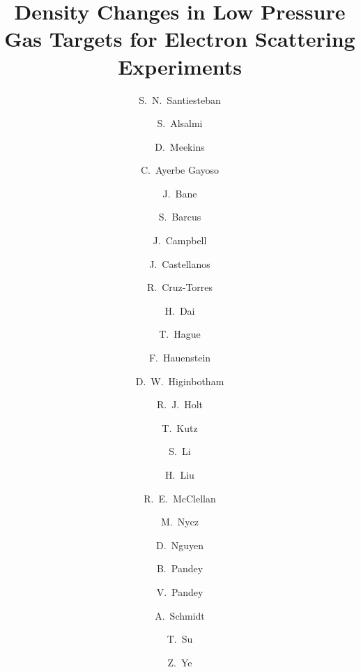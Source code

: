 \documentclass[review,numbers,sort&compress]{elsarticle}
\begin{document}
\linenumbers

\begin{frontmatter}


\title{Density Changes in Low Pressure Gas Targets for Electron Scattering Experiments}

\author[UNH]{S.~N.~Santiesteban}
\author[Kent]{S.~Alsalmi}
\author[JLab]{D.~Meekins}
\author[WM]{C.~Ayerbe Gayoso}
\author[TN]{J.~Bane}
\author[WM]{S.~Barcus}
\author[SM]{J.~Campbell}
\author[FI]{J.~Castellanos}
\author[MIT]{R.~Cruz-Torres}
\author[VT]{H.~Dai}
\author[Kent]{T.~Hague}
\author[OD]{F.~Hauenstein}
\author[JLab]{D.~W.~Higinbotham}
\author[argonne,CalTech]{R.~J.~Holt}
\author[SB]{T.~Kutz}
\author[UNH]{S.~Li}
\author[COL]{H.~Liu}
\author[JLab]{R.~E.~McClellan}
\author[Kent]{M.~Nycz}
\author[UVA]{ D.~Nguyen}
\author[hampton]{B.~Pandey}
\author[VT]{V.~Pandey}
\author[MIT]{A.~Schmidt}
\author[Kent]{T.~Su}
\author[argonne]{Z.~Ye}


\address[UNH]{University of New Hampshire, Durham, New Hampshire 03824, USA}
\address[Kent]{Kent State University, Kent, Ohio 44240, USA}
\address[JLab]{Jefferson Lab, Newport News, Virginia 23601 USA}
\address[TN]{The University of Tennessee, Knoxville, Tennessee 37996, USA}
\address[WM]{The College of William and Mary, Williamsburg, Virginia 23187, USA}
\address[SM]{Saint Mary's University, Halifax, Nova Scotia, Canada}
\address[FI]{Florida International University, Miami, Florida 33199 USA}
\address[MIT]{Massachusetts Institute of Technology, Cambridge, Massachusetts 02139, USA}
\address[VT]{Center for Neutrino Physics, Virginia Tech, Blacksburg, Virginia 24061, USA}
\address[OD]{Old Dominion University, Norfolk, Virginia 23529, USA}
\address[CalTech]{Kellogg Radiation Laboratory, California Institute of Technology, Pasadena California 91125 USA}
\address[argonne]{Physics Division, Argonne National Laboratory, Argonne, Illinois 60439, USA}
\address[COL]{Columbia University, New York, New York 10027, USA}
\address[SB]{Stony Brook University, Stony Brook, New York 11794, USA}
\address[UVA]{Department of Physics, University of Virginia, Charlottesville, Virginia 22904, USA}
\address[hampton]{Hampton University, Hampton, Virginia 23669, USA}


\end{frontmatter}
\end{document}
